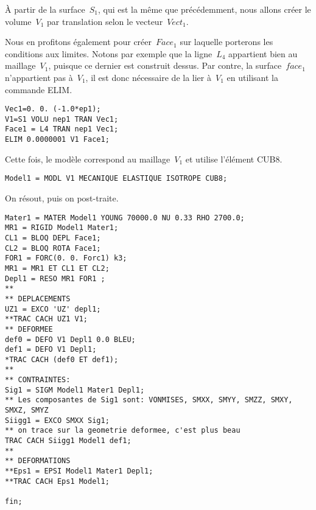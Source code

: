 À partir de la surface~$S_1$, qui est la même que précédemment, nous allons créer le volume~$V_1$ par translation selon le vecteur~$Vect_1$.

Nous en profitons également pour créer~$Face_1$ sur laquelle porterons les conditions aux limites. Notons par exemple que la ligne~$L_4$ appartient bien au maillage~$V_1$, puisque ce dernier est construit dessus. Par contre, la surface~$face_1$ n'appartient pas à~$V_1$, il est donc nécessaire de la lier à~$V_1$ en utilisant la commande ELIM.
\begin{lstlisting}[firstnumber=last]
Vec1=0. 0. (-1.0*ep1);
V1=S1 VOLU nep1 TRAN Vec1;
Face1 = L4 TRAN nep1 Vec1;
ELIM 0.0000001 V1 Face1;
\end{lstlisting}

Cette fois, le modèle correspond au maillage~$V_1$ et utilise l'élément CUB8.
\begin{lstlisting}[firstnumber=last]
Model1 = MODL V1 MECANIQUE ELASTIQUE ISOTROPE CUB8;
\end{lstlisting}

On résout, puis on post-traite.
\begin{lstlisting}[firstnumber=last]
Mater1 = MATER Model1 YOUNG 70000.0 NU 0.33 RHO 2700.0;
MR1 = RIGID Model1 Mater1;
CL1 = BLOQ DEPL Face1;
CL2 = BLOQ ROTA Face1;
FOR1 = FORC(0. 0. Forc1) k3;
MR1 = MR1 ET CL1 ET CL2;
Depl1 = RESO MR1 FOR1 ;
**
** DEPLACEMENTS
UZ1 = EXCO 'UZ' depl1;
**TRAC CACH UZ1 V1;
** DEFORMEE
def0 = DEFO V1 Depl1 0.0 BLEU;
def1 = DEFO V1 Depl1;
*TRAC CACH (def0 ET def1);
**
** CONTRAINTES: 
Sig1 = SIGM Model1 Mater1 Depl1;
** Les composantes de Sig1 sont: VONMISES, SMXX, SMYY, SMZZ, SMXY, SMXZ, SMYZ
Siigg1 = EXCO SMXX Sig1;
** on trace sur la geometrie deformee, c'est plus beau
TRAC CACH Siigg1 Model1 def1;
**
** DEFORMATIONS
**Eps1 = EPSI Model1 Mater1 Depl1;
**TRAC CACH Eps1 Model1;

fin;
\end{lstlisting}
